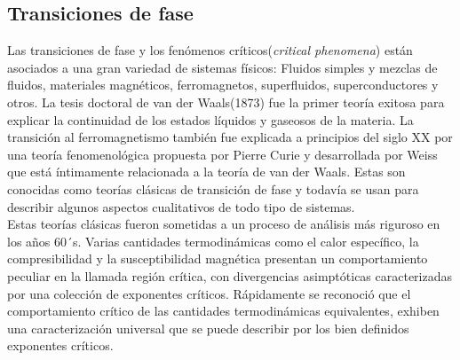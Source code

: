 \documentclass[a4paper]{article}
\begin{document}
\subsection{Transiciones de fase}
Las transiciones de fase y los fenómenos críticos(\textit{critical phenomena}) están asociados a una gran variedad de sistemas físicos: Fluidos simples y mezclas de fluidos, materiales magnéticos, ferromagnetos, superfluidos, superconductores y otros. La tesis doctoral de van der Waals(1873) fue la primer teoría exitosa para explicar la continuidad de los estados líquidos y gaseosos de la materia. La transición al ferromagnetismo también fue explicada a principios del siglo XX por una teoría fenomenológica propuesta por Pierre Curie y desarrollada por Weiss que está íntimamente relacionada a la teoría de van der Waals. Estas son conocidas como teorías clásicas de transición de fase y todavía se usan para describir algunos aspectos cualitativos de todo tipo de sistemas.\\

Estas teorías clásicas fueron sometidas a un proceso de análisis más riguroso en los años 60´s. Varias cantidades termodinámicas como el calor específico, la compresibilidad y la susceptibilidad magnética presentan un comportamiento peculiar en la llamada región crítica, con divergencias asimptóticas caracterizadas por una colección de exponentes críticos. Rápidamente se reconoció que el comportamiento crítico de las cantidades termodinámicas equivalentes, exhiben una caracterización universal que se puede describir por los bien definidos exponentes críticos.  \\
\end{document}
